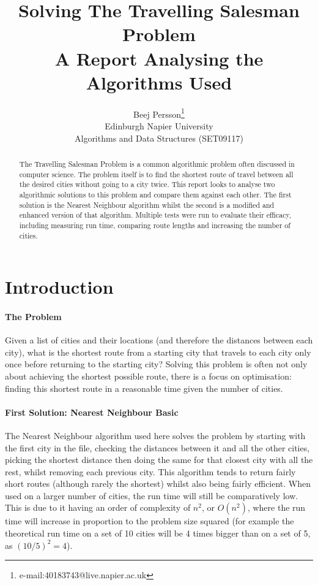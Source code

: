 \documentclass[conference,backref=page]{acmsiggraph}
\title{Solving The Travelling Salesman Problem\\
	   A Report Analysing the Algorithms Used}
\author{Beej Persson\thanks{e-mail:40183743@live.napier.ac.uk} \\
Edinburgh Napier University\\
Algorithms and Data Structures (SET09117)}
\begin{document}
\maketitle

\raggedbottom

\begin{abstract}

The Travelling Salesman Problem is a common algorithmic problem often discussed in computer science. The problem itself is to find the shortest route of travel between all the desired cities without going to a city twice. This report looks to analyse two algorithmic solutions to this problem and compare them against each other. The first solution is the Nearest Neighbour algorithm whilst the second is a modified and enhanced version of that algorithm. Multiple tests were run to evaluate their efficacy, including measuring run time, comparing route lengths and increasing the number of cities.

\end{abstract}

\keywordlist

\section{Introduction}


\paragraph{The Problem}
Given a list of cities and their locations (and therefore the distances between each city), what is the shortest route from a starting city that travels to each city only once before returning to the starting city? Solving this problem is often not only about achieving the shortest possible route, there is a focus on optimisation: finding this shortest route in a reasonable time given the number of cities.

\paragraph{First Solution: Nearest Neighbour Basic}
The Nearest Neighbour algorithm used here solves the problem by starting with the first city in the file, checking the distances between it and all the other cities, picking the shortest distance then doing the same for that closest city with all the rest, whilst removing each previous city. This algorithm tends to return fairly short routes (although rarely the shortest) whilst also being fairly efficient. When used on a larger number of cities, the run time will still be comparatively low. This is due to it having an order of complexity of $n^2$, or $O(n^2)$, where the run time will increase in proportion to the problem size squared (for example the theoretical run time on a set of 10 cities will be 4 times bigger than on a set of 5, as $(10/5)^2 = 4$).
\end{document}
